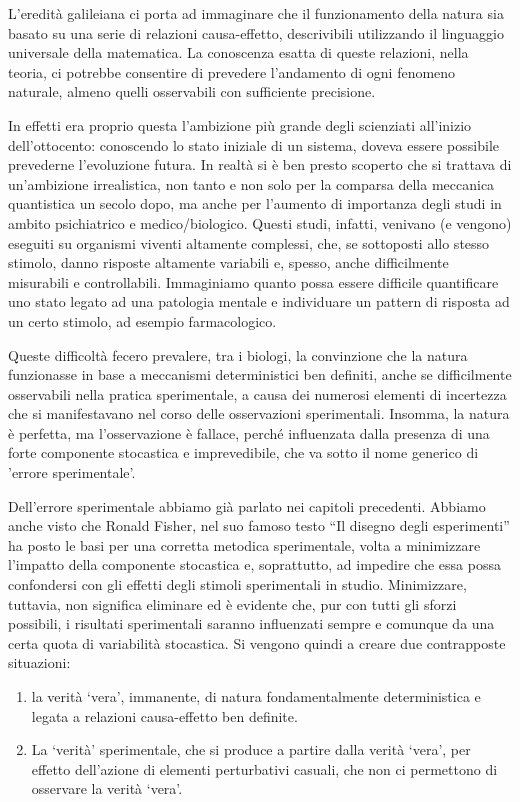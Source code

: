 \documentclass[a4paper,12pt,oneside]{book}
\providecommand{\tightlist}{%
  \setlength{\itemsep}{0pt}\setlength{\parskip}{0pt}}
\theoremstyle{definition}
\theoremstyle{definition}
\theoremstyle{definition}
\theoremstyle{remark}
\begin{document}
L'eredità galileiana ci porta ad immaginare che il funzionamento della
natura sia basato su una serie di relazioni causa-effetto, descrivibili
utilizzando il linguaggio universale della matematica. La conoscenza
esatta di queste relazioni, nella teoria, ci potrebbe consentire di
prevedere l'andamento di ogni fenomeno naturale, almeno quelli
osservabili con sufficiente precisione.

In effetti era proprio questa l'ambizione più grande degli scienziati
all'inizio dell'ottocento: conoscendo lo stato iniziale di un sistema,
doveva essere possibile prevederne l'evoluzione futura. In realtà si è
ben presto scoperto che si trattava di un'ambizione irrealistica, non
tanto e non solo per la comparsa della meccanica quantistica un secolo
dopo, ma anche per l'aumento di importanza degli studi in ambito
psichiatrico e medico/biologico. Questi studi, infatti, venivano (e
vengono) eseguiti su organismi viventi altamente complessi, che, se
sottoposti allo stesso stimolo, danno risposte altamente variabili e,
spesso, anche difficilmente misurabili e controllabili. Immaginiamo
quanto possa essere difficile quantificare uno stato legato ad una
patologia mentale e individuare un pattern di risposta ad un certo
stimolo, ad esempio farmacologico.

Queste difficoltà fecero prevalere, tra i biologi, la convinzione che la
natura funzionasse in base a meccanismi deterministici ben definiti,
anche se difficilmente osservabili nella pratica sperimentale, a causa
dei numerosi elementi di incertezza che si manifestavano nel corso delle
osservazioni sperimentali. Insomma, la natura è perfetta, ma
l'osservazione è fallace, perché influenzata dalla presenza di una forte
componente stocastica e imprevedibile, che va sotto il nome generico di
'errore sperimentale'.

Dell'errore sperimentale abbiamo già parlato nei capitoli precedenti.
Abbiamo anche visto che Ronald Fisher, nel suo famoso testo ``Il disegno
degli esperimenti'' ha posto le basi per una corretta metodica
sperimentale, volta a minimizzare l'impatto della componente stocastica
e, soprattutto, ad impedire che essa possa confondersi con gli effetti
degli stimoli sperimentali in studio. Minimizzare, tuttavia, non
significa eliminare ed è evidente che, pur con tutti gli sforzi
possibili, i risultati sperimentali saranno influenzati sempre e
comunque da una certa quota di variabilità stocastica. Si vengono quindi
a creare due contrapposte situazioni:

\begin{enumerate}
\def\labelenumi{\arabic{enumi}.}
\tightlist
\item
  la verità `vera', immanente, di natura fondamentalmente deterministica
  e legata a relazioni causa-effetto ben definite.
\item
  La `verità' sperimentale, che si produce a partire dalla verità
  `vera', per effetto dell'azione di elementi perturbativi casuali, che
  non ci permettono di osservare la verità `vera'.
\end{enumerate}
\end{document}
